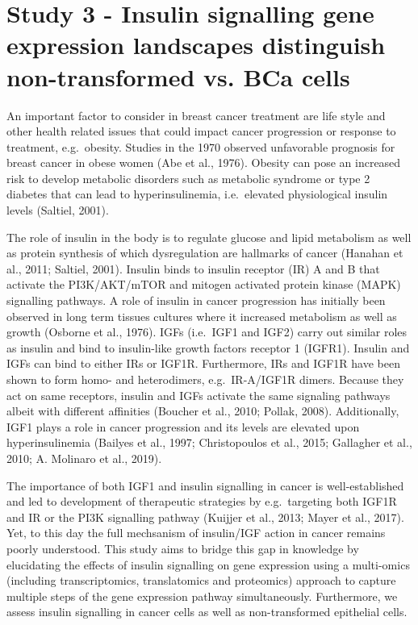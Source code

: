 \documentclass[12pt,openany]{book}
\begin{document}
\section{Study 3 - Insulin signalling gene expression landscapes distinguish non-transformed vs. BCa cells}

An important factor to consider in breast cancer treatment are life
style and other health related issues that could impact cancer
progression or response to treatment, e.g.~obesity. Studies in the 1970
observed unfavorable prognosis for breast cancer in obese women (Abe et
al., 1976). Obesity can pose an increased risk to develop metabolic
disorders such as metabolic syndrome or type 2 diabetes that can lead to
hyperinsulinemia, i.e.~elevated physiological insulin levels (Saltiel,
2001).

The role of insulin in the body is to regulate glucose and lipid
metabolism as well as protein synthesis of which dysregulation are
hallmarks of cancer (Hanahan et al., 2011; Saltiel, 2001). Insulin binds
to insulin receptor (IR) A and B that activate the PI3K/AKT/mTOR and
mitogen activated protein kinase (MAPK) signalling pathways. A role of
insulin in cancer progression has initially been observed in long term
tissues cultures where it increased metabolism as well as growth
(Osborne et al., 1976). IGFs (i.e.~IGF1 and IGF2) carry out similar
roles as insulin and bind to insulin-like growth factors receptor 1
(IGFR1). Insulin and IGFs can bind to either IRs or IGF1R. Furthermore,
IRs and IGF1R have been shown to form homo- and heterodimers,
e.g.~IR-A/IGF1R dimers. Because they act on same receptors, insulin and
IGFs activate the same signaling pathways albeit with different
affinities (Boucher et al., 2010; Pollak, 2008). Additionally, IGF1
plays a role in cancer progression and its levels are elevated upon
hyperinsulinemia (Bailyes et al., 1997; Christopoulos et al., 2015;
Gallagher et al., 2010; A. Molinaro et al., 2019).

The importance of both IGF1 and insulin signalling in cancer is
well-established and led to development of therapeutic strategies by
e.g.~targeting both IGF1R and IR or the PI3K signalling pathway (Kuijjer
et al., 2013; Mayer et al., 2017). Yet, to this day the full mechsanism
of insulin/IGF action in cancer remains poorly understood. This study
aims to bridge this gap in knowledge by elucidating the effects of
insulin signalling on gene expression using a multi-omics (including
transcriptomics, translatomics and proteomics) approach to capture
multiple steps of the gene expression pathway simultaneously.
Furthermore, we assess insulin signalling in cancer cells as well as
non-transformed epithelial cells.
\end{document}
